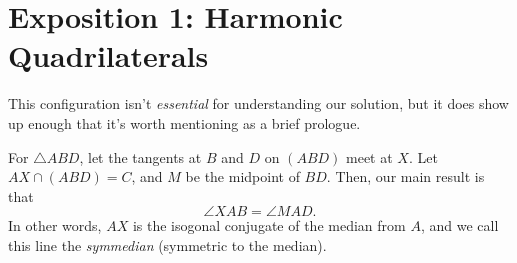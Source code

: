 \section*{Exposition 1: Harmonic Quadrilaterals}

This configuration isn't \textit{essential} for understanding our solution, but it does show up enough that it's worth mentioning as a brief prologue.\V

For $\triangle{ABD}$, let the tangents at $B$ and $D$ on $(ABD)$ meet at $X$. Let $AX\cap (ABD) = C$, and $M$ be the midpoint of $BD$. Then, our main result is that \[\angle{XAB} = \angle{MAD}.\tag{1.1}\label{1.1}\] In other words, $AX$ is the isogonal conjugate of the median from $A$, and we call this line the \textit{symmedian} (symmetric to the median).

